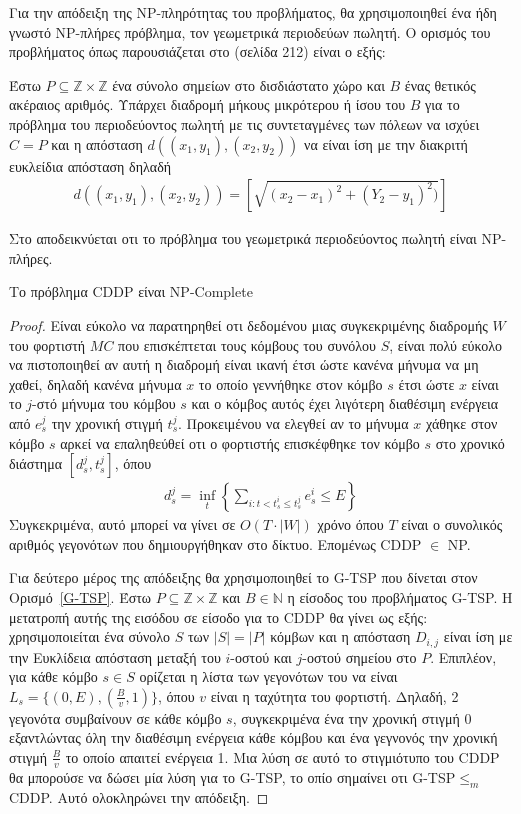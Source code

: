 Για την απόδειξη της NP-πληρότητας του προβλήματος, θα χρησιμοποιηθεί ένα ήδη γνωστό NP-πλήρες πρόβλημα, τον γεωμετρικά περιοδεύων πωλητή. Ο ορισμός του προβλήματος
όπως παρουσιάζεται στο \cite{Garey_Johnson} (σελίδα 212) είναι ο εξής:
\begin{definition}
\label{G-TSP} 
Έστω $P \subseteq \mathbb{Z} \times \mathbb{Z}$ ένα σύνολο σημείων στο δισδιάστατο χώρο και $B$ ένας θετικός ακέραιος αριθμός.
Υπάρχει διαδρομή μήκους μικρότερου ή ίσου του $B$ για το πρόβλημα του περιοδεύοντος πωλητή με τις συντεταγμένες των πόλεων να ισχύει $C=P$ και η απόσταση
$d((x_{1},y_{1}),(x_{2},y_{2}))$ να είναι ίση με την διακριτή ευκλείδια απόσταση δηλαδή
\begin{align*}
d((x_{1},y_{1}),(x_{2},y_{2})) = [\sqrt{(x_{2}-x_{1})^{2} + (Y_{2}-y_{1})^{2})}]
\end{align*}
\end{definition}
Στο \cite{PapadimitriouNP} αποδεικνύεται οτι το πρόβλημα του γεωμετρικά περιοδεύοντος πωλητή είναι NP-πλήρες.
\begin{theorem}\label{th:np-complete}
Το πρόβλημα CDDP είναι NP-Complete
\end{theorem}
\begin{proof}
Είναι εύκολο να παρατηρηθεί οτι δεδομένου μιας συγκεκριμένης διαδρομής $W$ του φορτιστή $MC$ που επισκέπτεται τους κόμβους του συνόλου $S$, είναι πολύ εύκολο να
πιστοποιηθεί αν αυτή η διαδρομή είναι ικανή έτσι ώστε κανένα μήνυμα να μη χαθεί, δηλαδή κανένα μήνυμα $x$ το οποίο γεννήθηκε στον κόμβο $s$ έτσι ώστε $x$ είναι το
$j$-στό μήνυμα του κόμβου $s$ και ο κόμβος αυτός έχει λιγότερη διαθέσιμη ενέργεια από $e^{j}_{s}$ την χρονική στιγμή $t^{j}_{s}$. Προκειμένου να ελεγθεί αν το μήνυμα
$x$ χάθηκε στον κόμβο $s$ αρκεί να επαληθεύθεί οτι ο φορτιστής επισκέφθηκε τον κόμβο $s$ στο χρονικό διάστημα $[d_s^j, t_s^j]$, όπου
\begin{align*}
d_s^j = \inf_t\left\{ \sum_{i: t < t_s^i \leq t_s^j} e_s^{i} \leq E \right\}
\end{align*}
Συγκεκριμένα, αυτό μπορεί να γίνει σε $O(T \cdot |W|)$ χρόνο όπου $T$ είναι ο συνολικός αριθμός γεγονότων που δημιουργήθηκαν στο δίκτυο. Επομένως CDDP $\in$ NP.

Για δεύτερο μέρος της απόδειξης θα χρησιμοποιηθεί το G-TSP που δίνεται στον Ορισμό~\ref{G-TSP}. Έστω $P \subseteq \mathbb{Z} \times \mathbb{Z}$ και $Β\in
\mathbb{N}$ η είσοδος του προβλήματος G-TSP. Η μετατροπή αυτής της εισόδου σε είσοδο για το CDDP θα γίνει ως εξής: χρησιμοποιείται ένα σύνολο $S$ των $|S|=|P|$
κόμβων και η απόσταση $D_{i,j}$ είναι ίση με την Ευκλίδεια απόσταση μεταξή του $i$-οστού και $j$-οστού σημείου στο $P$. Επιπλέον, για κάθε κόμβο $s\in S$
ορίζεται η λίστα των γεγονότων του να είναι $L_{s} = \{(0, E), (\frac{B}{v}, 1)\}$, όπου $v$ είναι η ταχύτητα του φορτιστή. Δηλαδή, 2 γεγονότα συμβαίνουν σε κάθε
κόμβο $s$, συγκεκριμένα ένα την χρονική στιγμή 0 εξαντλώντας όλη την διαθέσιμη ενέργεια κάθε κόμβου και ένα γεγνονός την χρονική στιγμή $\frac{B}{v}$ το οποίο
απαιτεί ενέργεια 1. Μια λύση σε αυτό το στιγμιότυπο του CDDP θα μπορούσε να δώσει μία λύση για το G-TSP, το οπίο σημαίνει οτι G-TSP$\leq_{m}$CDDP. Αυτό ολοκληρώνει
την απόδειξη.
\end{proof}

